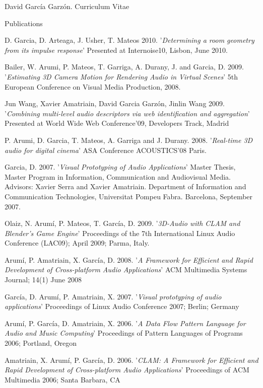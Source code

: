 \documentclass{article}
\begin{document}
\begin{cv}{David García Garzón. Curriculum Vitae}
\begin{cvlist}{Publications}
\item[] {\sc D. Garcia, D. Arteaga,  J.  Usher, T. Mateos} 2010.
'{\em Determining a room geometry from its impulse response}'
Presented at Internoise10, Lisbon, June 2010.

\item[] {\sc Bailer, W. Arumi, P. Mateos, T. Garriga, A. Durany, J. and Garcia, D.} 2009.
'{\em Estimating 3D Camera Motion for Rendering Audio in Virtual Scenes}'
5th European Conference on Visual Media Production, 2008.

\item[] {\sc Jun Wang, Xavier Amatriain, David Garcia Garzón, Jinlin Wang} 2009.
'{\em Combining multi-level audio descriptors via web identification and aggregation}'
Presented at World Wide Web Conference'09, Developers Track, Madrid

\item[] {\sc P. Arumi, D. Garcia, T. Mateos, A. Garriga and J. Durany.} 2008.
'{\em Real-time 3D audio for digital cinema}'
ASA Conference ACOUSTICS'08 Paris.

\item[] {\sc Garcia, D.} 2007.
'{\em Visual Prototyping of Audio Applications}'
Master Thesis, Master Program in Information, Communication and Audiovisual Media. Advisors: Xavier Serra and Xavier Amatriain. Department of Information and Communication Technologies, Universitat Pompeu Fabra. Barcelona, September 2007.

\item[] {\sc Olaiz, N. Arumí, P. Mateos, T. García, D.} 2009.
'{\em 3D-Audio with CLAM and Blender's Game Engine}'
Proceedings of the 7th International Linux Audio Conference (LAC09); April 2009; Parma, Italy.

\item[] {\sc Arumí, P. Amatriain, X. García, D.} 2008.
'{\em A Framework for Efficient and Rapid Development of Cross-platform Audio Applications}'
ACM Multimedia Systems Journal; 14(1) June 2008

\item[] {\sc García, D. Arumí, P. Amatriain, X.} 2007.
'{\em Visual prototyping of audio applications}'
Proceedings of Linux Audio Conference 2007; Berlin; Germany

\item[] {\sc Arumí, P. García, D. Amatriain, X.} 2006.
'{\em A Data Flow Pattern Language for Audio and Music Computing}'
Proceedings of Pattern Languages of Programs 2006; Portland, Oregon

\item[] {\sc Amatriain, X. Arumí, P. García, D.} 2006.
'{\em CLAM: A Framework for Efficient and Rapid Development of Cross-platform Audio Applications}'
Proceedings of ACM Multimedia 2006; Santa Barbara, CA


\end{cvlist}
\end{cv}
\end{document}

